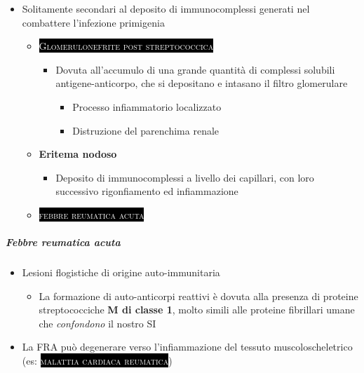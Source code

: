 \documentclass[italian,]{article}
\providecommand{\tightlist}{%
  \setlength{\itemsep}{0pt}\setlength{\parskip}{0pt}}
\newcommand{\pat}[1]{\colorbox{black}{\textcolor{white}{\textsc{#1}}}}
\begin{document}
\begin{itemize}
\tightlist
\item
  Solitamente secondari al deposito di immunocomplessi generati nel
  combattere l'infezione primigenia

  \begin{itemize}
  \tightlist
  \item
    \pat{Glomerulonefrite post streptococcica}~

    \begin{itemize}
    \tightlist
    \item
      Dovuta all'accumulo di una grande quantità di complessi solubili
      antigene-anticorpo, che si depositano e intasano il filtro
      glomerulare

      \begin{itemize}
      \tightlist
      \item
        Processo infiammatorio localizzato
      \item
        Distruzione del parenchima renale
      \end{itemize}
    \end{itemize}
  \item
    \textbf{Eritema nodoso}

    \begin{itemize}
    \tightlist
    \item
      Deposito di immunocomplessi a livello dei capillari, con loro
      successivo rigonfiamento ed infiammazione
    \end{itemize}
  \item
    \pat{febbre reumatica acuta}~
  \end{itemize}
\end{itemize}

\hypertarget{febbre-reumatica-acuta}{%
\subparagraph{Febbre reumatica acuta}\label{febbre-reumatica-acuta}}

\begin{itemize}
\tightlist
\item
  Lesioni flogistiche di origine auto-immunitaria

  \begin{itemize}
  \tightlist
  \item
    La formazione di auto-anticorpi reattivi è dovuta alla presenza di
    proteine streptococciche \textbf{M di classe 1}, molto simili alle
    proteine fibrillari umane che \emph{confondono} il nostro SI
  \end{itemize}
\item
  La FRA può degenerare verso l'infiammazione del tessuto
  muscoloscheletrico (es: \pat{malattia cardiaca reumatica})
\end{itemize}
\end{document}
